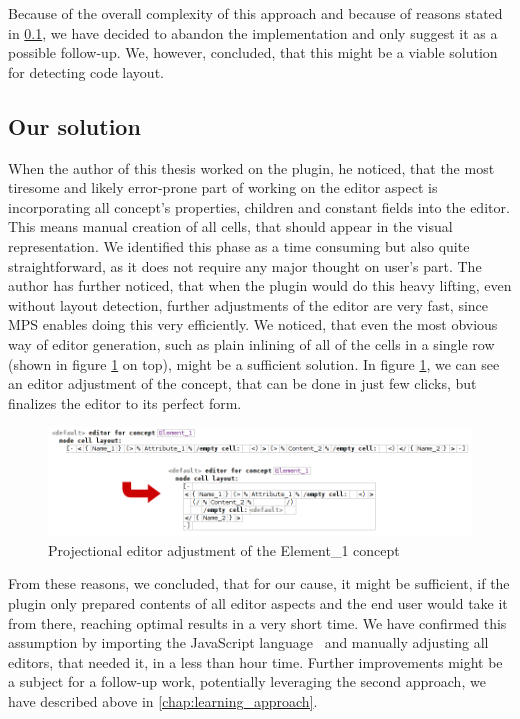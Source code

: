 Because of the overall complexity of this approach and because of reasons stated in \ref{chap:editor_solution}, we have decided to abandon the implementation and only suggest it as a possible follow-up.
We, however, concluded, that this might be a viable solution for detecting code layout.

\subsection{Our solution}
\label{chap:editor_solution}

When the author of this thesis worked on the plugin, he noticed, that the most tiresome and likely error-prone part of working on the editor aspect is incorporating all concept's properties, children and constant fields into the editor.
This means manual creation of all cells, that should appear in the visual representation.
We identified this phase as a time consuming but also quite straightforward, as it does not require any major thought on user's part.
The author has further noticed, that when the plugin would do this heavy lifting, even without layout detection, further adjustments of the editor are very fast, since MPS enables doing this very efficiently.
We noticed, that even the most obvious way of editor generation, such as plain inlining of all of the cells in a single row (shown in figure \ref{fig:editor_adjustment} on top), might be a sufficient solution.
In figure \ref{fig:editor_adjustment}, we can see an editor adjustment of the  concept, that can be done in just few clicks, but finalizes the editor to its perfect form.
\\

\begin{figure}[h]
	\centering
	\includegraphics[width=\textwidth]{./img/editor_adjustment.png}
	\caption{Projectional editor adjustment of the Element{\_}1 concept}
	\label{fig:editor_adjustment}
\end{figure}

From these reasons, we concluded, that for our cause, it might be sufficient, if the plugin only prepared contents of all editor aspects and the end user would take it from there, reaching optimal results in a very short time.
We have confirmed this assumption by importing the JavaScript language~\cite{javascript} and manually adjusting all editors, that needed it, in a less than hour time.
Further improvements might be a subject for a follow-up work, potentially leveraging the second approach, we have described above in \ref{chap:learning_approach}.

